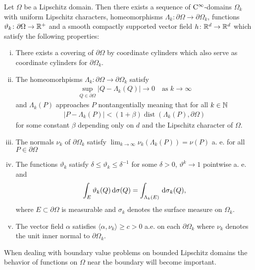 \begin{thm}
  Let $\Omega$ be a Lipschitz domain.
  Then there exists a sequence of $\mathrm{C}^\infty$-domains $\Omega_k$ with uniform Lipschitz characters, homeomorphisms $\Lambda_k \colon \partial\Omega \to \partial\Omega_k$, functions $\vartheta_k \colon \partial\Omega \to \mathbb{R}^+$ and a smooth compactly supported vector field $h \colon \mathbb{R}^d \to \mathbb{R}^d$ which satisfy the following properties:
  \begin{enumerate}[i)]
    \item There exists a covering of $\partial\Omega$ by coordinate cylinders which also serve as coordinate cylinders for $\partial\Omega_k$.
    \item The homeomorhpisms $\Lambda_k \colon \partial \Omega \to \partial\Omega_k$ satisfy
      \begin{align*}
        \sup_{Q \in \partial\Omega} |Q - \Lambda_k(Q)| \to 0\quad\text{as } k \to \infty
      \end{align*}
      and $\Lambda_k(P)$ approaches $P$ nontangentially meaning that for all $k \in \mathbb{N}$
      \begin{align*}
        | P - \Lambda_k(P) | < (1 + \beta) \operatorname{dist}(\Lambda_k(P), \partial\Omega)
      \end{align*}
      for some constant $\beta$ depending only on $d$ and the Lipschitz character of $\Omega$.
    \item The normals $\nu_k$ of $\partial\Omega_k$ satisfy $\lim_{k \to \infty} \nu_k(\Lambda_k(P)) = \nu(P)$ a. e. for all $P \in \partial\Omega$
    \item The functions $\vartheta_k$ satisfy $\delta \leq \vartheta_k \leq \delta^{-1}$ for some $\delta > 0$, $\vartheta^k \to 1$ pointwise a. e. and
      \begin{align*}
        \int_E \vartheta_k(Q) \, {\operatorname{d}\!{\sigma}}(Q) = \int_{\Lambda_k(E)} \, {\operatorname{d}\!{\sigma}}_k(Q),
      \end{align*}
      where $E \subset \partial \Omega$ is measurable and $\sigma_k$ denotes the surface measure on $\Omega_k$.
    \item The vector field $\alpha$ satisfies $\langle \alpha, \nu_k \rangle \geq c > 0$ a.e. on each $\partial\Omega_k$ where $\nu_k$ denotes the unit inner normal to $\partial\Omega_k$.
  \end{enumerate}
\end{thm}

When dealing with boundary value problems on bounded Lipschitz domains the behavior of functions on $\Omega$ near the boundary will become important.

